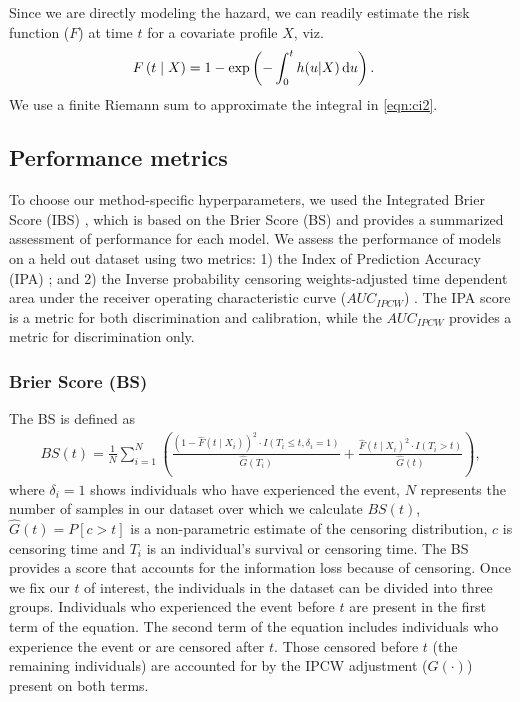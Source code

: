 \documentclass[APA,LATO1COL]{WileyNJD-v2}
\begin{document}
Since we are directly modeling the hazard, we can readily estimate the
risk function (\(F\)) at time \(t\) for a covariate profile \(X\),
viz.\begin{align}\label{eqn:ci2}
F\left(t\mid X\right)& = 1 - \exp\left(-\int_{0}^{t}h(u|X) \,\textrm du\right).
\end{align} We use a finite Riemann sum \citep{hughes2020calculus} to
approximate the integral in \eqref{eqn:ci2}.



\hypertarget{performance-metrics}{%
\subsection{Performance metrics}\label{performance-metrics}}

To choose our method-specific hyperparameters, we used the Integrated Brier Score (IBS) \citep{graf1999}, which is based on the
Brier Score (BS) and provides a summarized assessment of performance for each model. We assess the performance of models on
a held out dataset using two metrics: 1) the Index of Prediction Accuracy (IPA) \citep{kattan2018index}; and 2) the Inverse probability
censoring weights-adjusted time dependent area under the receiver operating characteristic curve ($AUC_{IPCW}$) \citep{auc}. The
IPA score is a metric for both discrimination and calibration, while the $AUC_{IPCW}$ provides a metric for discrimination only.

\hypertarget{bs}{%
\subsubsection{Brier Score (BS)}\label{bs}}
The BS \citep{graf1999} is defined as \begin{align}\label{eqn:bs}
BS(t)=\frac{1}{N}\sum^{N}_{i=1}\left(\frac{\left(1 - \widehat{F}(t \mid X_{i})\right)^{2}\cdot I(T_{i}\leq t,\delta_{i}=1)}{\widehat{G}(T_{i})} + \frac{\widehat{F}(t\mid X_{i})^{2}\cdot I(T_{i}>t)}{\widehat{G}(t)}\right),
\end{align} where \(\delta_{i}=1\) shows individuals who have experienced the event, \(N\) represents the number of samples
in our dataset over which we calculate \(BS(t)\), \(\widehat{G}(t)=P[c>t]\) is a non-parametric estimate of the censoring distribution,
\(c\) is censoring time and \(T_{i}\) is an individual's survival or censoring time. The BS provides a score that accounts for the
information loss because of censoring. Once we fix our \(t\) of interest, the individuals in the dataset can be divided into three
groups. Individuals who experienced the event before \(t\) are present in the first term of the equation. The second term of the
equation includes individuals who experience the event or are censored after \(t\). Those censored before \(t\) (the remaining
individuals) are accounted for by the IPCW adjustment (\(G(\cdot)\)) present on both terms.
\end{document}
